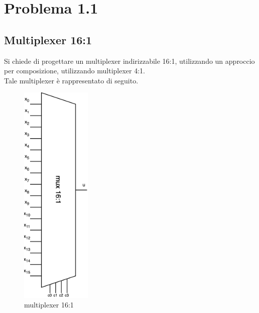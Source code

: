 \chapter{Problema 1.1}

\section{Multiplexer 16:1}

Si chiede di progettare un multiplexer indirizzabile 16:1, utilizzando un approccio per composizione, utilizzando multiplexer 4:1.\\
Tale multiplexer è rappresentato di seguito.
\begin{figure}[H]
	\centering
	\includegraphics[width=0.3\textwidth]{img/01}
	\caption{multiplexer 16:1}
	\label{mux_16:1} 
\end{figure}

